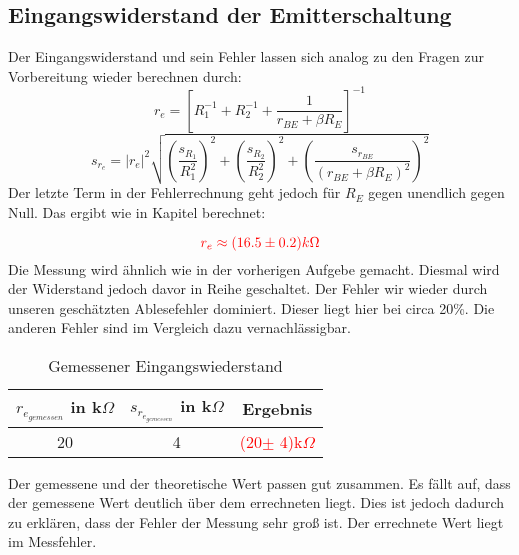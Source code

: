 \subsection{Eingangswiderstand der Emitterschaltung} \label{Eingspa}

Der Eingangswiderstand und sein Fehler lassen sich analog zu den Fragen zur Vorbereitung wieder berechnen durch:
\begin{equation*}
    r_e = [R_{1}^{-1}+R_{2}^{-1}+\frac{1}{r_{BE}+\beta R_E}]^{-1}
\end{equation*}
\begin{equation*}
    s_{r_e} = | r_e |^2 \sqrt{(\frac{s_{R_1}}{R_1^2})^2+(\frac{s_{R_2}}{R_2^2})^2+(\frac{s_{r_{BE}}}{(r_{BE}+\beta R_E)^2} )^2} 
\end{equation*}
Der letzte Term in der Fehlerrechnung geht jedoch für $R_E$ gegen unendlich gegen Null.
Das ergibt wie in Kapitel %
berechnet:

\begin{equation*}
    \textcolor{red}{r_e \approx	 (16.5 \pm 0.2)k\Omega}
\end{equation*}
Die Messung wird ähnlich wie in der vorherigen Aufgebe gemacht. Diesmal wird der Widerstand jedoch davor in Reihe geschaltet. Der Fehler wir wieder durch unseren geschätzten 
Ablesefehler dominiert. Dieser liegt hier bei circa 20\%. Die anderen Fehler sind im Vergleich dazu vernachlässigbar.
\begin{table}[h]
    \centering
    \begin{tabular}{c|c||c}
        $r_{e_{gemessen}}$ in k$\Omega$ & $s_{r_{e_{gemessen}}}$ in k$\Omega$ & Ergebnis\\
        \hline
        20 & 4 & \textcolor{red}{(20$\pm $ 4)k$\Omega$}
    \end{tabular}
    \caption{Gemessener Eingangswiederstand}
\end{table}

Der gemessene und der theoretische Wert passen gut zusammen. Es fällt auf, dass der gemessene Wert deutlich 
über dem errechneten liegt. Dies ist jedoch dadurch zu erklären, dass der Fehler der Messung sehr groß ist. 
Der errechnete Wert liegt im Messfehler.
